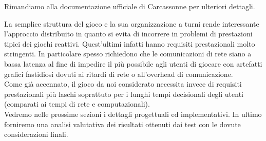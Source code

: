 Rimandiamo alla documentazione ufficiale di Carcassonne per ulteriori
dettagli.

La semplice struttura del gioco e la sua organizzazione a turni rende
interessante l'approccio distribuito in quanto si evita di incorrere in problemi 
di prestazioni tipici dei giochi reattivi. Quest'ultimi infatti hanno requisiti prestazionali molto stringenti. In
particolare spesso richiedono che le comunicazioni di rete siano a bassa
latenza al fine di impedire il più possibile agli utenti di giocare con
artefatti grafici fastidiosi dovuti ai ritardi di rete o all'overhead di
comunicazione.\\
Come già accennato, il gioco da noi considerato necessita invece di
requisiti prestazionali più laschi soprattuto per i lunghi tempi
decisionali degli utenti (comparati ai tempi di rete e computazionali).
\\
Vedremo nelle prossime sezioni i dettagli progettuali ed implementativi.
In ultimo forniremo una analisi valutativa dei risultati ottenuti dai test
con le dovute considerazioni finali.
